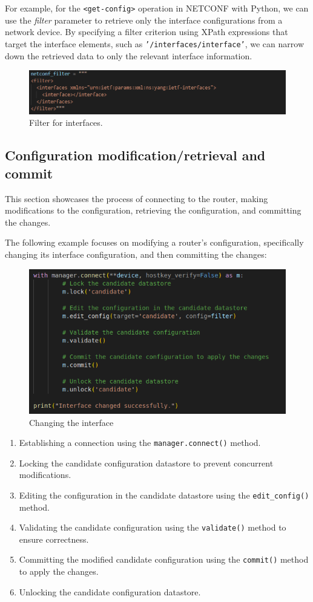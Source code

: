 For example, for the \texttt{<get-config>} operation in NETCONF with Python, we can use the \textit{filter} parameter to retrieve only the interface configurations from a network device. By specifying a filter criterion using XPath expressions that target the interface elements, such as \texttt{'/interfaces/interface'}, we can narrow down the retrieved data to only the relevant interface information.

\begin{figure}[h]
    \centering
    \includegraphics[width=0.8\linewidth]{Images/filter_int.png}
    \caption{Filter for interfaces.}
\end{figure}
\subsection{Configuration modification/retrieval and commit}

This section showcases the process of connecting to the router, making modifications to the configuration, retrieving the configuration, and committing the changes.

The following example focuses on modifying a router's configuration, specifically changing its interface configuration, and then committing the changes:

\begin{figure}[h]
  \centering
  \includegraphics[width=0.7\linewidth]{Images/change_int.png}
  \caption{Changing the interface}
\end{figure}

\begin{enumerate}
  \item Establishing a connection using the \texttt{manager.connect()} method.
  \item Locking the candidate configuration datastore to prevent concurrent modifications.
  \item Editing the configuration in the candidate datastore using the \texttt{edit\_config()} method.
  \item Validating the candidate configuration using the \texttt{validate()} method to ensure correctness.
  \item Committing the modified candidate configuration using the \texttt{commit()} method to apply the changes.
  \item Unlocking the candidate configuration datastore.
\end{enumerate}


